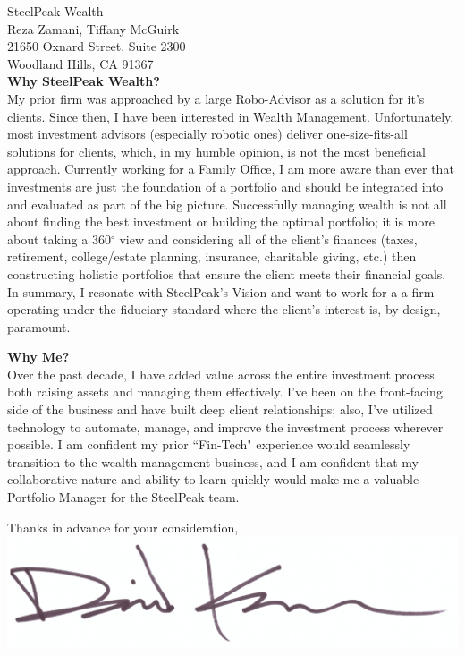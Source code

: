 \documentclass{letter}
\begin{document}
\begin{letter}{
  SteelPeak Wealth \\
  Reza Zamani, Tiffany McGuirk \\
  21650 Oxnard Street, Suite 2300 \\
  Woodland Hills, CA 91367 \\
}
\textbf{Why SteelPeak Wealth?} \\
My prior firm was approached by a large Robo-Advisor as a solution
for it's clients. Since then, I have been interested in Wealth Management. Unfortunately,
most investment advisors (especially robotic ones) deliver one-size-fits-all
solutions for clients, which, in my humble opinion, is not the most beneficial
approach. Currently working for a Family Office, I am more aware than ever that investments are
just the foundation of a portfolio and should be integrated into and evaluated
as part of the big picture. Successfully managing wealth is not all about finding
the best investment or building the optimal portfolio; it is more about taking a
360$^{\circ}$ view and considering all of the client's finances (taxes, retirement,
college/estate planning, insurance, charitable giving, etc.) then constructing
holistic portfolios that ensure the client meets their financial goals. In summary,
I resonate with SteelPeak's Vision and want to work for a a firm operating under the
fiduciary standard where the client's interest is, by design, paramount.

\textbf{Why Me?} \\
Over the past decade, I have added value across the entire investment process
both raising assets and managing them effectively. I've been on the front-facing
side of the business and have built deep client relationships; also, I've utilized
 technology to automate, manage, and improve the investment process wherever
possible. I am confident my prior ``Fin-Tech" experience would seamlessly 
transition to the wealth management business, and I am confident that my collaborative
nature and ability to learn quickly would make me a valuable Portfolio Manager
for the SteelPeak team.
 
\closing{
  Thanks in advance for your consideration, \\
  \includegraphics[scale=0.33]{signature.png}
}

\end{letter}
\end{document}
